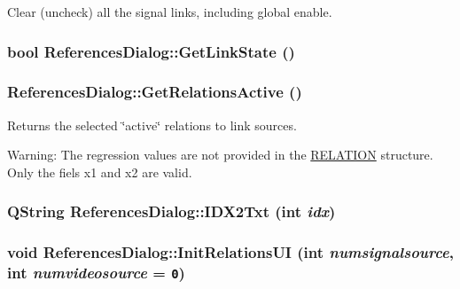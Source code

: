 Clear (uncheck) all the signal links, including global enable. 

\hypertarget{class_references_dialog_8f0db69f00d805371a0f96a8fa5b1325}{
\subsubsection[{GetLinkState}]{\setlength{\rightskip}{0pt plus 5cm}bool ReferencesDialog::GetLinkState ()}}
\label{class_references_dialog_8f0db69f00d805371a0f96a8fa5b1325}


\hypertarget{class_references_dialog_ee8ef020f8207cdbc20fe135a6e484ea}{
\subsubsection[{GetRelationsActive}]{ ReferencesDialog::GetRelationsActive ()}}
\label{class_references_dialog_ee8ef020f8207cdbc20fe135a6e484ea}


Returns the selected \char`\"{}active\char`\"{} relations to link sources. 

\begin{Desc}
\item[Warning:]The regression values are not provided in the \hyperlink{struct_r_e_l_a_t_i_o_n}{RELATION} structure. Only the fiels x1 and x2 are valid. \end{Desc}
\hypertarget{class_references_dialog_c9d8d09d650f73f5f55aa86e0e5c2cd7}{
\subsubsection[{IDX2Txt}]{\setlength{\rightskip}{0pt plus 5cm}QString ReferencesDialog::IDX2Txt (int {\em idx})}}
\label{class_references_dialog_c9d8d09d650f73f5f55aa86e0e5c2cd7}


\hypertarget{class_references_dialog_bbb001e60a9a5427fdccc08bc6877cb2}{
\subsubsection[{InitRelationsUI}]{\setlength{\rightskip}{0pt plus 5cm}void ReferencesDialog::InitRelationsUI (int {\em numsignalsource}, \/  int {\em numvideosource} = {\tt 0})}}
\label{class_references_dialog_bbb001e60a9a5427fdccc08bc6877cb2}


